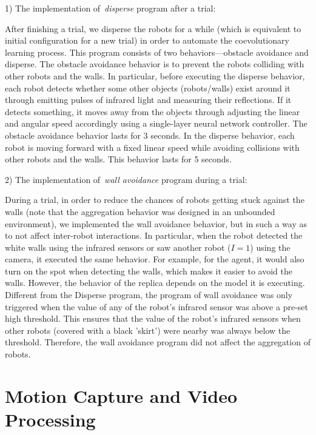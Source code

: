 1) The implementation of~\textit{disperse} program after a trial:

After finishing a trial, we disperse the robots for a while (which is equivalent to initial configuration for a new trial) in order to automate the coevolutionary learning process. This program consists of two behaviors---obstacle avoidance and disperse. The obstacle avoidance behavior is to prevent the robots colliding with other robots and the walls. In particular, before executing the disperse behavior, each robot detects whether some other objects (robots/walls) exist around it through emitting pulses of infrared light and measuring their reflections. If it detects something, it moves away from the objects through adjusting the linear and angular speed accordingly using a single-layer neural network controller. The obstacle avoidance behavior lasts for 3 seconds. In the disperse behavior, each robot is moving forward with a fixed linear speed while avoiding collisions with other robots and the walls. This behavior lasts for 5 seconds.

2) The implementation of~\textit{wall avoidance} program during a trial:

During a trial, in order to reduce the chances of robots getting stuck against the walls (note that the aggregation behavior was designed in an unbounded environment), we implemented the wall avoidance behavior, but in such a way as to not affect inter-robot interactions. In particular, when the robot detected the white walls using the infrared sensors or saw another robot ($I=1$) using the camera, it executed the same behavior. For example, for the agent, it would also turn on the spot when detecting the walls, which makes it easier to avoid the walls. However, the behavior of the replica depends on the model it is executing. Different from the Disperse program, the program of wall avoidance was only triggered when the value of any of the robot's infrared sensor was above a pre-set high threshold. This ensures that the value of the robot's infrared sensors when other robots (covered with a black 'skirt') were nearby was always below the threshold. Therefore, the wall avoidance program did not affect the aggregation of robots.

\section{Motion Capture and Video Processing}\label{motion_capture_and_video_processing_swarm_physical}

